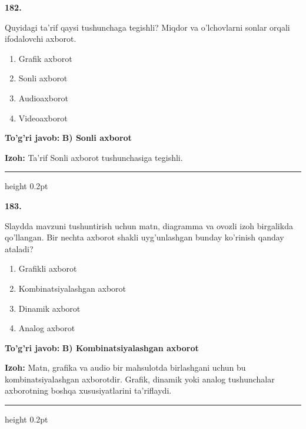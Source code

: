\documentclass[10pt,a4paper,oneside]{article}
\begin{document}
\noindent\textbf{\color{ink}182.}
\par
Quyidagi ta'rif qaysi tushunchaga tegishli? Miqdor va o'lchovlarni sonlar orqali ifodalovchi axborot.
\begin{enumerate}[label=\Alph*),leftmargin=9mm]
\item Grafik axborot
\item Sonli axborot
\item Audioaxborot
\item Videoaxborot
\end{enumerate}
\begin{tcolorbox}[enhanced,breakable,colback=teal!4,colframe=teal!50!black,boxrule=0.5pt,arc=1.1mm,left=3mm,right=3mm,top=1.7mm,bottom=1.7mm,before skip=2mm,after skip=2mm]
\textbf{\color{teal}To'g'ri javob:} \textbf{B) Sonli axborot}
\par\smallskip
\textbf{Izoh:} Ta'rif Sonli axborot tushunchasiga tegishli.
\end{tcolorbox}
\vspace{2mm}\hrule height 0.2pt \vspace{3mm}

\noindent\textbf{\color{ink}183.}
\par
Slaydda mavzuni tushuntirish uchun matn, diagramma va ovozli izoh birgalikda qo'llangan. Bir nechta axborot shakli uyg'unlashgan bunday ko'rinish qanday ataladi?
\begin{enumerate}[label=\Alph*),leftmargin=9mm]
\item Grafikli axborot
\item Kombinatsiyalashgan axborot
\item Dinamik axborot
\item Analog axborot
\end{enumerate}
\begin{tcolorbox}[enhanced,breakable,colback=teal!4,colframe=teal!50!black,boxrule=0.5pt,arc=1.1mm,left=3mm,right=3mm,top=1.7mm,bottom=1.7mm,before skip=2mm,after skip=2mm]
\textbf{\color{teal}To'g'ri javob:} \textbf{B) Kombinatsiyalashgan axborot}
\par\smallskip
\textbf{Izoh:} Matn, grafika va audio bir mahsulotda birlashgani uchun bu kombinatsiyalashgan axborotdir. Grafik, dinamik yoki analog tushunchalar axborotning boshqa xususiyatlarini ta'riflaydi.
\end{tcolorbox}
\vspace{2mm}\hrule height 0.2pt \vspace{3mm}
\end{document}
